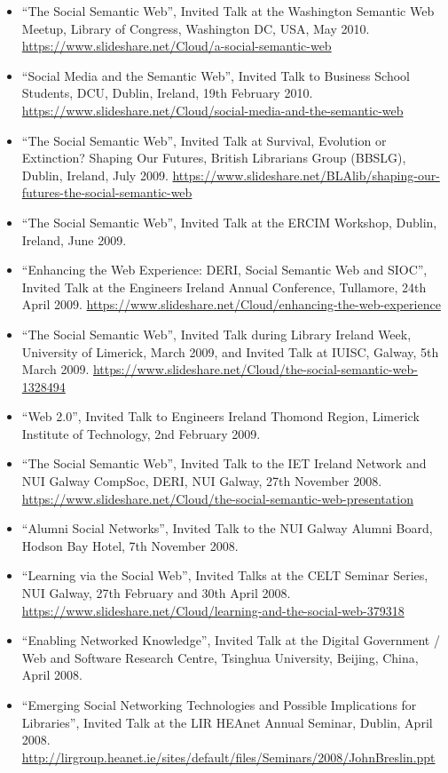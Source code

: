 \documentclass[10pt,a4paper]{res} %
\begin{document}
\begin{resume}
\begin{itemize}
\item ``The Social Semantic Web'', Invited Talk at the Washington Semantic Web Meetup, Library of Congress, Washington DC, USA, May 2010. \url{https://www.slideshare.net/Cloud/a-social-semantic-web}
\item ``Social Media and the Semantic Web'', Invited Talk to Business School Students, DCU, Dublin, Ireland, 19th February 2010. \url{https://www.slideshare.net/Cloud/social-media-and-the-semantic-web}
\item ``The Social Semantic Web'', Invited Talk at Survival, Evolution or Extinction? Shaping Our Futures, British Librarians Group (BBSLG), Dublin, Ireland, July 2009. \url{https://www.slideshare.net/BLAlib/shaping-our-futures-the-social-semantic-web}
\item ``The Social Semantic Web'', Invited Talk at the ERCIM Workshop, Dublin, Ireland, June 2009. %
\item ``Enhancing the Web Experience: DERI, Social Semantic Web and SIOC'', Invited Talk at the Engineers Ireland Annual Conference, Tullamore, 24th April 2009. \url{https://www.slideshare.net/Cloud/enhancing-the-web-experience}
\item ``The Social Semantic Web'', Invited Talk during Library Ireland Week, University of Limerick, March 2009, and Invited Talk at IUISC, Galway, 5th March 2009. \url{https://www.slideshare.net/Cloud/the-social-semantic-web-1328494}
\item ``Web 2.0'', Invited Talk to Engineers Ireland Thomond Region, Limerick Institute of Technology, 2nd February 2009. %
\item ``The Social Semantic Web'', Invited Talk to the IET Ireland Network and NUI Galway CompSoc, DERI, NUI Galway, 27th November 2008. \url{https://www.slideshare.net/Cloud/the-social-semantic-web-presentation}
\item ``Alumni Social Networks'', Invited Talk to the NUI Galway Alumni Board, Hodson Bay Hotel, 7th November 2008.
\item ``Learning via the Social Web'', Invited Talks at the CELT Seminar Series, NUI Galway, 27th February and 30th April 2008. \url{https://www.slideshare.net/Cloud/learning-and-the-social-web-379318}
\item ``Enabling Networked Knowledge'', Invited Talk at the Digital Government / Web and Software Research Centre, Tsinghua University, Beijing, China, April 2008. %
\item ``Emerging Social Networking Technologies and Possible Implications for Libraries'', Invited Talk at the LIR HEAnet Annual Seminar, Dublin, April 2008. \url{http://lirgroup.heanet.ie/sites/default/files/Seminars/2008/JohnBreslin.ppt}

\end{itemize}
\end{resume}
\end{document}
